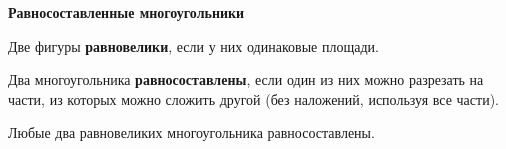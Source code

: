 \documentclass{article}
\begin{document}
    \large

    \begin{center}
        \textbf{Равносоставленные многоугольники}
    \end{center}

    \begin{definition}
        Две фигуры \textbf{равновелики}, если у них одинаковые площади.
    \end{definition}

    \begin{definition}
        Два многоугольника \textbf{равносоставлены}, если один из них можно разрезать на части, из которых можно сложить другой (без наложений, используя все части).
    \end{definition}

    \begin{theorem}
        Любые два равновеликих многоугольника равносоставлены.
    \end{theorem}
\end{document}
